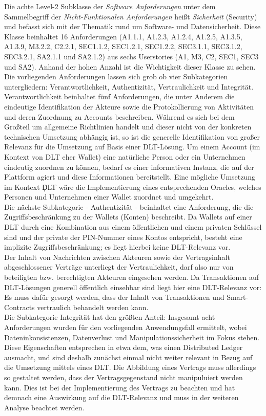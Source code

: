 Die achte Level-2 Subklasse der \textit{Software Anforderungen} unter dem Sammelbegriff der \textit{Nicht-Funktionalen Anforderungen} heißt \textit{Sicherheit} (Security) und befasst sich mit der Thematik rund um Software- und Datensicherheit. Diese Klasse beinhaltet 16 Anforderungen (A1.1.1, A1.2.3, A1.2.4, A1.2.5, A1.3.5, A1.3.9, M3.2.2, C2.2.1, SEC1.1.2, SEC1.2.1, SEC1.2.2, SEC3.1.1, SEC3.1.2, SEC3.2.1, SA2.1.1 und SA2.1.2) aus sechs Userstories (A1, M3, C2, SEC1, SEC3 und SA2). Anhand der hohen Anzahl ist die Wichtigkeit dieser Klasse zu sehen. Die vorliegenden Anforderungen lassen sich grob ob vier Subkategorien untergliedern: Verantwortlichkeit, Authentizität, Vertraulichkeit und Integrität. Verantwortlichkeit beinhaltet fünf Anforderungen, die unter Anderem die eindeutige Identifikation der Akteure sowie die Protokollierung von Aktivitäten und deren Zuordnung zu Accounts beschreiben. Während es sich bei dem Großteil um allgemeine Richtlinien handelt und dieser nicht von der konkreten technischen Umsetzung abhängig ist, so ist die generelle Identifikation von großer Relevanz für die Umsetzung auf Basis einer \ac{DLT}-Lösung. Um einem Account (im Kontext von \ac{DLT} eher Wallet) eine natürliche Person oder ein Unternehmen eindeutig zuordnen zu können, bedarf es einer informativen Instanz, die auf der Plattform agiert und diese Informationen bereitstellt. Eine mögliche Umsetzung im Kontext \c{DLT} wäre die Implementierung eines entsprechenden Oracles, welches Personen und Unternehmen einer Wallet zuordnet und umgekehrt.\\
Die nächste Subkategorie - Authentizität - beinhaltet eine Anforderung, die die Zugriffsbeschränkung zu der Wallets (Konten) beschreibt. Da Wallets auf einer \ac{DLT} durch eine Kombination aus einem öffentlichen und einem privaten Schlüssel sind und der private der PIN-Nummer eines Kontos entspricht, besteht eine implizite Zugriffsbeschränkung; es liegt hierbei keine \ac{DLT}-Relevanz vor.\\
Der Inhalt von Nachrichten zwischen Akteuren sowie der Vertragsinhalt abgeschlossener Verträge unterliegt der Vertraulichkeit, darf also nur von beteiligten bzw. berechtigten Akteuren eingesehen werden. Da Transaktionen auf \ac{DLT}-Lösungen generell öffentlich einsehbar sind liegt hier eine \ac{DLT}-Relevanz vor: Es muss dafür gesorgt werden, dass der Inhalt von Transaktionen und Smart-Contracts vertraulich behandelt werden kann.\\
Die Subkategorie Integrität hat den größten Anteil: Insgesamt acht Anforderungen wurden für den vorliegenden Anwendungsfall ermittelt, wobei Dateninkonsistenzen, Datenverlust und Manipulationssicherheit im Fokus stehen. Diese Eigenschaften entsprechen in etwa dem, was einen Distributed Ledger ausmacht, und sind deshalb zunächst einmal nicht weiter relevant in Bezug auf die Umsetzung mittels eines \ac{DLT}. Die Abbildung eines Vertrags muss allerdings so gestaltet werden, dass der Vertragsgegenstand nicht manipuluiert werden kann. Dies ist bei der Implementierung des Vertrags zu beachten und hat demnach eine Auswirkung auf die \ac{DLT}-Relevanz und muss in der weiteren Analyse beachtet werden.


